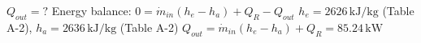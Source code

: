 \( Q_{out} = ? \)  
Energy balance: \( 0 = \dot{m}_{in} (h_e - h_a) + Q_R - Q_{out} \)  
\( h_e = 2626 \, \text{kJ/kg} \) (Table A-2), \( h_a = 2636 \, \text{kJ/kg} \) (Table A-2)  
\( Q_{out} = \dot{m}_{in} (h_e - h_a) + Q_R = 85.24 \, \text{kW} \)